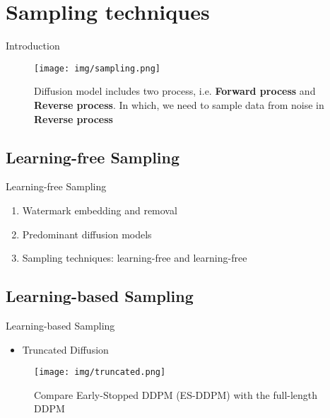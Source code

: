 \section{Sampling techniques}

\setcounter{footnote}{1} 
\begin{frame}{Introduction}
    \begin{figure}
        \centering
        \texttt{[image: img/sampling.png]}
        \caption{Diffusion model includes two process, i.e. \textbf{Forward process} and \textbf{Reverse process}. In which, we need to sample data from noise in \textbf{Reverse process} \footnotemark[1]}
        \label{fig:enter-label}
    \end{figure}
\end{frame}

\subsection{Learning-free Sampling}
\begin{frame}{Learning-free Sampling}
    \begin{enumerate}
        \item Watermark embedding and removal
        \item Predominant diffusion models
        \item Sampling techniques: learning-free and learning-free
    \end{enumerate}
\end{frame}

\subsection{Learning-based Sampling}
\setcounter{footnote}{2} 
\begin{frame}{Learning-based Sampling}
    \begin{itemize}
        \item Truncated Diffusion
    \end{itemize}
    \begin{figure}
        \centering
        \texttt{[image: img/truncated.png]}
        \caption{Compare Early-Stopped DDPM (ES-DDPM) with the full-length DDPM \footnotemark[2]}
    \end{figure}
\end{frame}